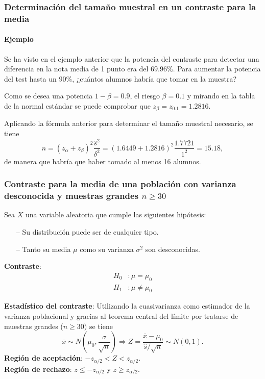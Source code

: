 \begin{frame}
\frametitle{Determinación del tamaño muestral en un contraste para la media}
\framesubtitle{Ejemplo}
Se ha visto en el ejemplo anterior que la potencia del contraste para detectar una diferencia en la nota media de 1
punto era del $69.96\%$. Para aumentar la potencia del test hasta un $90\%$, ¿cuántos alumnos habría que tomar en la
muestra?


Como se desea una potencia $1-\beta=0.9$, el riesgo $\beta=0.1$ y mirando en la tabla de la normal estándar se puede
comprobar que $z_\beta = z_{0.1}=1.2816$.

Aplicando la fórmula anterior para determinar el tamaño muestral necesario, se tiene
\[
n = (z_\alpha+z_\beta)^2\frac{\hat s^2}{\delta^2} = (1.6449+1.2816)^2\frac{1.7721}{1^2} = 15.18,
\]
de manera que habría que haber tomado al menos 16 alumnos.  
\end{frame}


\begin{frame}
\frametitle{Contraste para la media de una población con varianza desconocida y muestras grandes $n\geq 30$}
Sea $X$ una variable aleatoria que cumple las siguientes hipótesis:
\begin{itemize}
\item[--] Su distribución puede ser de cualquier tipo.
\item[--] Tanto su media $\mu$ como su varianza $\sigma^2$ son desconocidas.
\end{itemize}
\textbf{Contraste}:
\begin{align*} 
H_0 &: \mu=\mu_0\\
H_1 &: \mu\neq \mu_0
\end{align*}

\textbf{Estadístico del contraste}: Utilizando la cuasivarianza como estimador de la varianza poblacional y gracias al teorema
central del límite por tratarse de muestras grandes ($n\geq 30)$ se tiene
\[
\bar x\sim N\left(\mu_0,\frac{\sigma}{\sqrt{n}}\right) \Rightarrow Z=\frac{\bar x-\mu_0}{\hat s/\sqrt{n}}\sim N(0,1).
\]
\textbf{Región de aceptación}: $-z_{\alpha/2}< Z < z_{\alpha/2}$.\\
\textbf{Región de rechazo}: $z\leq -z_{\alpha/2}$ y $z\geq z_{\alpha/2}$.
\end{frame}


